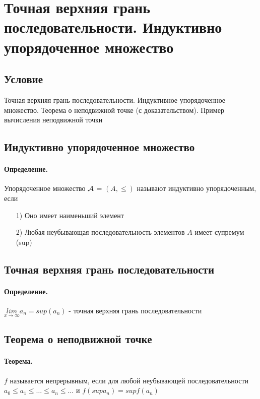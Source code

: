\documentclass{report}
\begin{document}
\newpage

\section{Точная верхняя грань последовательности. Индуктивно упорядоченное множество}
\subsection{Условие}
Точная верхняя грань последовательности. Индуктивное упорядоченное множество.
Теорема о неподвижной точке (с доказательством). Пример вычисления неподвижной
точки

\subsection{Индуктивно упорядоченное множество}
\paragraph*{Определение.}
Упорядоченное множество ${\cal A}$ = $(A, \leq)$ называют индуктивно упорядоченным, если
\begin{itemize}
    \item[1)] Оно имеет наименьший элемент
    \item[2)] Любая неубывающая последовательность элементов $A$ имеет супремум (sup)
\end{itemize}

\subsection{Точная верхняя грань последовательности}
\paragraph*{Определение.}
$\underset{x\rightarrow \infty}{lim}a_{n} = sup(a_n)$ - точная верхняя грань последовательности

\subsection{Теорема о неподвижной точке}
\paragraph*{Теорема.}
$f$ называется непрерывным, если для любой неубывающей последовательности
$a_{0} \leq a_{1} \leq \ldots \leq a_{n} \leq \ldots$ и
$f(supa_{n}) = supf(a_{n})$
\end{document}
